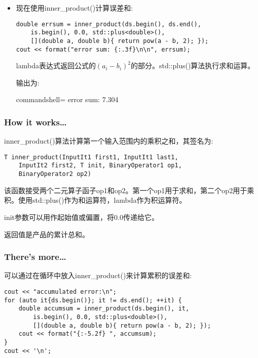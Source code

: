 \begin{itemize}
\item 
现在使用inner\_product()计算误差和:

\begin{lstlisting}[style=styleCXX]
double errsum = inner_product(ds.begin(), ds.end(),
	is.begin(), 0.0, std::plus<double>(),
	[](double a, double b){ return pow(a - b, 2); });
cout << format("error sum: {:.3f}\n\n", errsum);
\end{lstlisting}

lambda表达式返回公式的$ (a_i - b_i)^2 $的部分。std::plus()算法执行求和运算。

输出为:

\begin{tcblisting}{commandshell={}}
error sum: 7.304
\end{tcblisting}
\end{itemize}

\subsubsection{How it works…}

inner\_product()算法计算第一个输入范围内的乘积之和，其签名为:

\begin{lstlisting}[style=styleCXX]
T inner_product(InputIt1 first1, InputIt1 last1,
	InputIt2 first2, T init, BinaryOperator1 op1,
	BinaryOperator2 op2)
\end{lstlisting}

该函数接受两个二元算子函子op1和op2。第一个op1用于求和，第二个op2用于乘积。使用std::plus()作为和运算符，lambda作为积运算符。

init参数可以用作起始值或偏置，将0.0传递给它。

返回值是产品的累计总和。

\subsubsection{There's more…}

可以通过在循环中放入inner\_product()来计算累积的误差和:

\begin{lstlisting}[style=styleCXX]
cout << "accumulated error:\n";
for (auto it{ds.begin()}; it != ds.end(); ++it) {
	double accumsum = inner_product(ds.begin(), it,
		is.begin(), 0.0, std::plus<double>(),
		[](double a, double b){ return pow(a - b, 2); });
	cout << format("{:-5.2f} ", accumsum);
}
cout << '\n';
\end{lstlisting}

